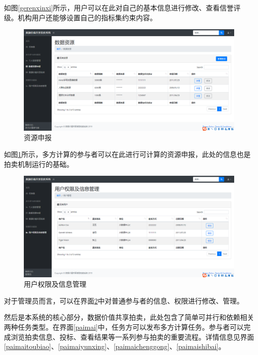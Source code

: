 \documentclass[promaster]{thesis-uestc}
\begin{document}
如图\ref{gerenxinxi}所示，用户可以在此对自己的基本信息进行修改、查看信誉评级。机构用户还能够设置自己的指标集约束内容。

\begin{figure}[H]
    \includegraphics[width=400pt]{ui/ziyuanshenbao.png}
    \caption{资源申报}
    \label{ziyuanshenbao}
\end{figure}

如图\ref{ziyuanshenbao}所示，多方计算的参与者可以在此进行可计算的资源申报，此处的信息也是拍卖机制运行的基础。

\begin{figure}[H]
    \includegraphics[width=400pt]{ui/yonghuguanli.png}
    \caption{用户权限及信息管理}
    \label{yonghuguanli}
\end{figure}

对于管理员而言，可以在界面\ref{yonghuguanli}中对普通参与者的信息、权限进行修改、管理。

然后是本系统的核心部分，数据价值共享拍卖，此处包含了简单可并行和依赖相关两种任务类型。在界面\ref{paimai}中，任务方可以发布多方计算任务。参与者可以完成浏览拍卖信息、投标、查看结果等一系列参与拍卖的重要流程。详情信息见界面\ref{paimaitoubiao}、\ref{paimaiyunxing}、\ref{paimaichenggong}、\ref{paimaishibai}。
\end{document}
